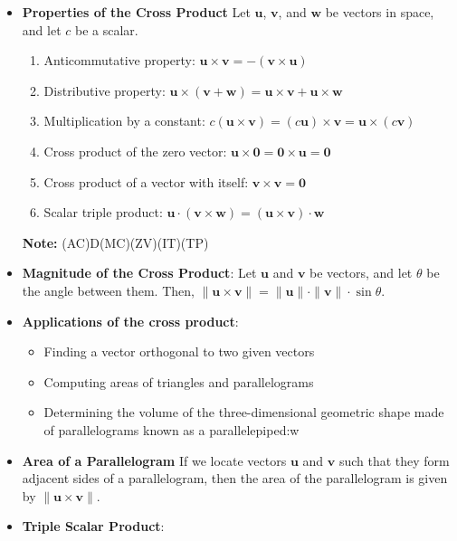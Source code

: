 \documentclass{report}
\begin{document}
\begin{itemize}
            \item \textbf{Properties of the Cross Product}
                Let $\mathbf{u}$, $\mathbf{v}$, and $\mathbf{w}$ be vectors in space, and let $c$ be a scalar.
                \begin{enumerate}
                    \item Anticommutative property: $\mathbf{u} \times \mathbf{v} = -(\mathbf{v} \times \mathbf{u})$
                    \item Distributive property: $\mathbf{u} \times (\mathbf{v} + \mathbf{w}) = \mathbf{u} \times \mathbf{v} + \mathbf{u} \times \mathbf{w}$
                    \item Multiplication by a constant: $c(\mathbf{u} \times \mathbf{v}) = (c\mathbf{u}) \times \mathbf{v} = \mathbf{u} \times (c\mathbf{v})$
                    \item Cross product of the zero vector: $\mathbf{u} \times \mathbf{0} = \mathbf{0} \times \mathbf{u} = \mathbf{0}$
                    \item Cross product of a vector with itself: $\mathbf{v} \times \mathbf{v} = \mathbf{0}$
                    \item Scalar triple product: $\mathbf{u} \cdot (\mathbf{v} \times \mathbf{w}) = (\mathbf{u} \times \mathbf{v}) \cdot \mathbf{w}$
                \end{enumerate}
                \textbf{Note:} (AC)D(MC)(ZV)(IT)(TP)
            \item \textbf{Magnitude of the Cross Product}:
                Let $\mathbf{u}$ and $\mathbf{v}$ be vectors, and let $\theta$ be the angle between them. Then, $\|\mathbf{u} \times \mathbf{v}\| = \|\mathbf{u}\| \cdot \|\mathbf{v}\| \cdot \sin \theta.$
            \item \textbf{Applications of the cross product}:
            \begin{itemize}
                \item Finding a vector orthogonal to two given vectors
                \item Computing areas of triangles and parallelograms
                \item Determining the volume of the three-dimensional geometric shape made of parallelograms known as a parallelepiped:w

            \end{itemize}
        \item \textbf{Area of a Parallelogram}
            If we locate vectors $\mathbf{u}$ and $\mathbf{v}$ such that they form adjacent sides of a parallelogram, then the area of the parallelogram is given by $\|\mathbf{u} \times \mathbf{v}\|$.
        \item \textbf{Triple Scalar Product}:


\end{itemize}
\end{document}
